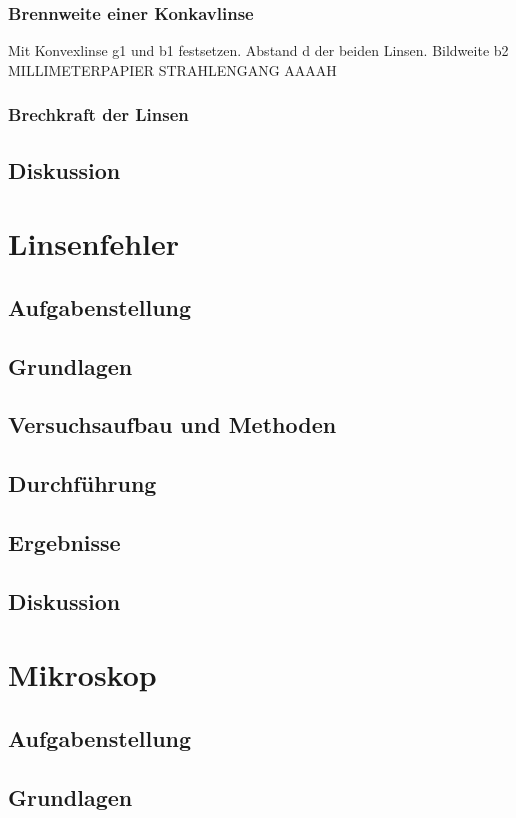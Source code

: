 \documentclass{article}
\begin{document}
\subsubsection*{Brennweite einer Konkavlinse}
Mit Konvexlinse g1 und b1 festsetzen. Abstand d der beiden Linsen. Bildweite b2
MILLIMETERPAPIER STRAHLENGANG AAAAH
\subsubsection*{Brechkraft der Linsen}
\subsection{Diskussion}

\section{Linsenfehler}

\subsection{Aufgabenstellung}
\subsection{Grundlagen}
\subsection{Versuchsaufbau und Methoden}
\subsection{Durchführung}
\subsection{Ergebnisse}
\subsection{Diskussion}

\section{Mikroskop}

\subsection{Aufgabenstellung}
\subsection{Grundlagen}
\end{document}
